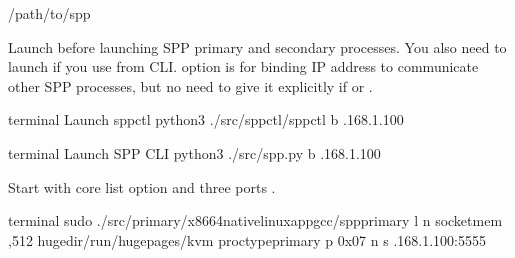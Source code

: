 \documentclass[a4paper,11pt,openany,oneside,english]{sphinxmanual}
\begin{document}
\begin{sphinxVerbatim}[commandchars=\\\{\},formatcom=\footnotesize]
  /path/to/spp
\end{sphinxVerbatim}

Launch  before launching SPP primary and secondary processes.
You also need to launch   if you use  from CLI.
 option is for binding IP address to communicate other SPP processes,
but no need to give it explicitly if  or  .

\begin{sphinxVerbatim}[commandchars=\\\{\},formatcom=\footnotesize]
 terminal 
 Launch spp\PYGZhy{}ctl
 python3 ./src/spp\PYGZhy{}ctl/spp\PYGZhy{}ctl \PYGZhy{}b .168.1.100
\end{sphinxVerbatim}

\begin{sphinxVerbatim}[commandchars=\\\{\},formatcom=\footnotesize]
 terminal 
 Launch SPP CLI
 python3 ./src/spp.py \PYGZhy{}b .168.1.100
\end{sphinxVerbatim}

Start  with core list option  and
three ports .

\begin{sphinxVerbatim}[commandchars=\\\{\},formatcom=\footnotesize]
 terminal 
 sudo ./src/primary/x86\PYGZus{}64\PYGZhy{}native\PYGZhy{}linuxapp\PYGZhy{}gcc/spp\PYGZus{}primary 
    \PYGZhy{}l  \PYGZhy{}n  
    \PYGZhy{}\PYGZhy{}socket\PYGZhy{}mem ,512 
    \PYGZhy{}\PYGZhy{}huge\PYGZhy{}dir/run/hugepages/kvm 
    \PYGZhy{}\PYGZhy{}proc\PYGZhy{}typeprimary 
    \PYGZhy{}\PYGZhy{} 
    \PYGZhy{}p 0x07 \PYGZhy{}n  \PYGZhy{}s .168.1.100:5555
\end{sphinxVerbatim}
\end{document}
